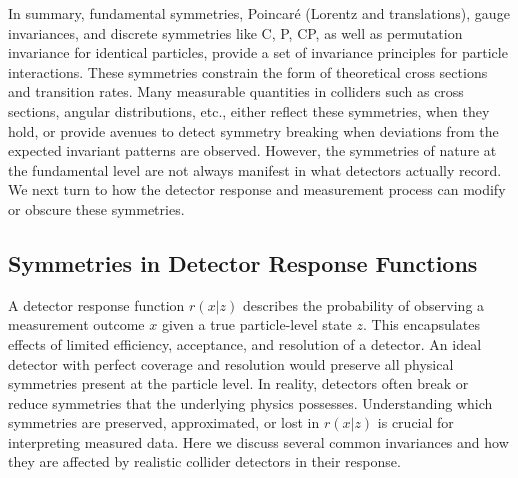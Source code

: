            In summary, fundamental symmetries, Poincaré (Lorentz and translations), gauge invariances, and discrete symmetries like C, P, CP, as well as permutation invariance for identical particles, provide a set of invariance principles for particle interactions.
            These symmetries constrain the form of theoretical cross sections and transition rates.
            Many measurable quantities in colliders such as cross sections, angular distributions, etc., either reflect these symmetries, when they hold, or provide avenues to detect symmetry breaking when deviations from the expected invariant patterns are observed.
            However, the symmetries of nature at the fundamental level are not always manifest in what detectors actually record.
            We next turn to how the detector response and measurement process can modify or obscure these symmetries.

    \subsection{Symmetries in Detector Response Functions}
    \label{subsec:detector-symmetries}
        A detector response function $r(x|z)$ describes the probability of observing a measurement outcome $x$ given a true particle-level state $z$.
        This encapsulates effects of limited efficiency, acceptance, and resolution of a detector.
        An ideal detector with perfect coverage and resolution would preserve all physical symmetries present at the particle level.
        In reality, detectors often break or reduce symmetries that the underlying physics possesses.
        Understanding which symmetries are preserved, approximated, or lost in $r(x|z)$ is crucial for interpreting measured data.
        Here we discuss several common invariances and how they are affected by realistic collider detectors in their response.

